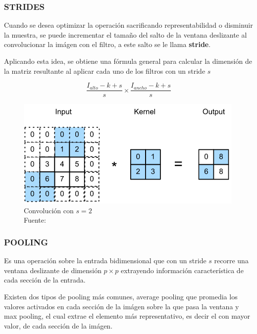         \subsubsection{STRIDES}
        Cuando se desea optimizar la operación sacrificando representabilidad o disminuir la muestra, se puede incrementar el tamaño del salto de la ventana deslizante al convolucionar la imágen con el filtro, a este salto se le llama \textbf{stride}.
        
        Aplicando esta idea, se obtiene una fórmula general para calcular la dimensión de la matriz resultante al aplicar cada uno de los filtros con un stride $s$
        
        $$\frac{I_{alto} - k + s}{s} \times \frac{I_{ancho} - k + s}{s}$$ 
        
        \begin{figure}[H]
            \centering
            \includegraphics[scale=0.55]{imagenes/stride}
            \caption[Convolución con $s=2$]{Convolución con $s=2$\\ Fuente: \citep{zhang2020dive}}
        \end{figure}
        \subsubsection{POOLING}
        Es una operación sobre la entrada bidimensional que con un stride $s$ recorre una ventana deslizante de dimensión $p \times p$ extrayendo información característica de cada sección de la entrada.
        
        Existen dos tipos de pooling más comunes, average pooling que promedia los valores activados en cada sección de la imágen sobre la que pasa la ventana y max pooling, el cual extrae el elemento más representativo, es decir el con mayor valor, de cada sección de la imágen.
        
